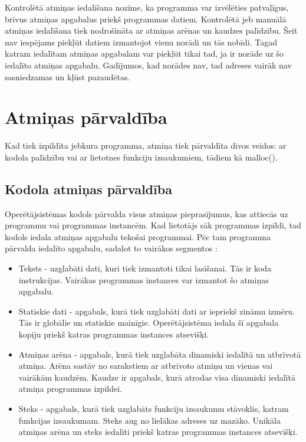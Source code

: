  Kontrolētā atmiņas iedalīšana nozīme, ka programma var izvēlēties patvaļīgus, brīvus atmiņas apgabalus priekš programmas datiem. 
Kontrolētā jeb manuālā atmiņas iedalīšana tiek nodrošināta ar atmiņas arēnas un kaudzes palīdzību. 
Šeit nav iespējams piekļūt datiem izmantojot vienu norādi un tās nobīdi. 
Tagad katram iedalītam atmiņas apgabalam var piekļūt tikai tad, ja ir norāde uz šo iedalīto atmiņas apgabalu. 
Gadījumos, kad norādes nav, tad adreses vairāk nav sasniedzamas un kļūst pazaudētas.


\section{Atmiņas pārvaldība}
Kad tiek izpildīta jebkura programma, atmiņa tiek pārvaldīta divos veidos: ar kodola palīdzību vai ar lietotnes funkciju izsaukumiem, tādiem kā malloc().

\subsection{Kodola atmiņas pārvaldība}
Operētājsistēmas kodols pārvalda  visus atmiņas pieprasījumus, kas attiecās uz programmu vai programmas instancēm.
Kad lietotājs sāk programmas izpildi, tad kodols iedala atmiņas apgabalu tekošai programmai.
Pēc tam programma pārvalda iedalīto apgabalu, sadalot to vairākos segmentos  \cite {atparv}: 
\begin{itemize}
	\item   Teksts - uzglabāti dati, kuri tiek izmantoti tikai lasīšanai. Tās ir koda instrukcijas. 
    Vairākas programmas instances var izmantot šo atmiņas apgabalu.
    \item Statiskie dati - apgabals, kurā tiek uzglabāti dati ar iepriekš zināmu izmēru. Tās ir globālie un statiskie mainīgie.
    Operētājsistēma iedala šī apgabala kopiju priekš katras programmas instances atsevišķi.
    \item Atmiņas arēna - apgabals, kurā tiek uzglabāta dinamiski iedalītā un atbrīvotā atmiņa. 
    Arēna sastāv no sarakstiem ar atbrīvoto atmiņu un vienas vai vairākām kaudzēm.
    Kaudze ir apgabals, kurā atrodas visa dinamiski iedalītā atmiņa programmas izpildei.
    \item Steks - apgabals, kurā tiek uzglabāts funkciju izsaukumu stāvoklis, katram funkcijas izsaukumam. Steks aug no lielākas adreses uz mazāko. 
    Unikāla atmiņas arēna un steks iedalīti priekš katras programmas instances atsevišķi.
\end{itemize} 

